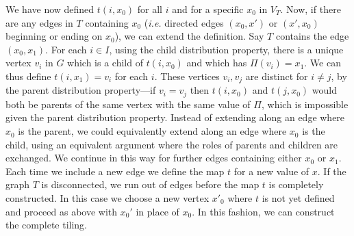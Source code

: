 \documentclass[12pt]{article}
\begin{document}
We have now defined $t (i, x_0)$ for all $i$ and for a specific $x_0$
in $V_T$.
Now, if
there are any edges in $T$ containing $x_0$ ({\it i.e.} directed edges
$(x_0, x')$ or $(x', x_0)$ beginning or
ending on $x_0$), we can extend the
definition.  Say $T$ contains the edge $(x_0, x_1)$.  For each $i \in
I$, using the child distribution property, there is a unique vertex
$v_i$ in $G$ which is a child of $t (i, x_0)$ and which has $\Pi (v_i)
= x_1$.  We can thus define $t (i, x_1) = v_i$ for each $i$.  These
vertices $v_i, v_j$ are distinct for $i \neq j$, by the parent
distribution property---if $v_i = v_j$ then $t (i, x_0)$ and
$t(j,x_0)$ would both be parents of the same vertex with the same
value of $\Pi$, which is impossible given the parent distribution
property.  Instead of extending along an edge where $x_0$ is the
parent, we could equivalently extend along an edge where $x_0$ is the
child, using an equivalent argument where the roles of parents and
children are exchanged.  We continue in this way for further edges
containing either $x_0$ or $x_1$.  Each time we include a new edge we
define the map $t$ for a new value of $x$.  If the graph $T$ is
disconnected, we run out of edges before the map $t$ is completely
constructed.  In this case we choose a new vertex $x'_0$ where $t$ is
not yet defined and proceed as above with $x_0'$ in place of $x_0$.
In this fashion, we can construct the complete tiling.
\end{document}
